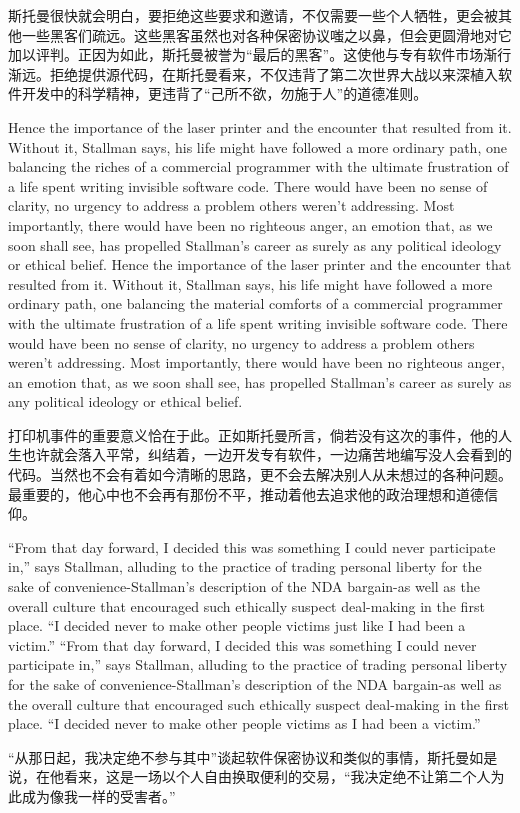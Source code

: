 \ifdefined\chs
斯托曼很快就会明白，要拒绝这些要求和邀请，不仅需要一些个人牺牲，更会被其他一些黑客们疏远。这些黑客虽然也对各种保密协议嗤之以鼻，但会更圆滑地对它加以评判。正因为如此，斯托曼被誉为``最后的黑客''。这使他与专有软件市场渐行渐远。拒绝提供源代码，在斯托曼看来，不仅违背了第二次世界大战以来深植入软件开发中的科学精神，更违背了``己所不欲，勿施于人''的道德准则。
\fi

\ifdefined\eng
\ifdefined\vone
Hence the importance of the laser printer and the encounter that resulted from it. Without it, Stallman says, his life might have followed a more ordinary path, one balancing the riches of a commercial programmer with the ultimate frustration of a life spent writing invisible software code. There would have been no sense of clarity, no urgency to address a problem others weren't addressing. Most importantly, there would have been no righteous anger, an emotion that, as we soon shall see, has propelled Stallman's career as surely as any political ideology or ethical belief.
\fi
\ifdefined\vtwo
Hence the importance of the laser printer and the encounter that resulted from it. Without it, Stallman says, his life might have followed a more ordinary path, one balancing the material comforts of a commercial programmer with the ultimate frustration of a life spent writing invisible software code. There would have been no sense of clarity, no urgency to address a problem others weren't addressing. Most importantly, there would have been no righteous anger, an emotion that, as we soon shall see, has propelled Stallman's career as surely as any political ideology or ethical belief.
\fi
\fi

\ifdefined\chs
打印机事件的重要意义恰在于此。正如斯托曼所言，倘若没有这次的事件，他的人生也许就会落入平常，纠结着，一边开发专有软件，一边痛苦地编写没人会看到的代码。当然也不会有着如今清晰的思路，更不会去解决别人从未想过的各种问题。最重要的，他心中也不会再有那份不平，推动着他去追求他的政治理想和道德信仰。 
\fi

\ifdefined\eng
\ifdefined\vone
``From that day forward, I decided this was something I could never participate in,'' says Stallman, alluding to the practice of trading personal liberty for the sake of convenience-Stallman's description of the NDA bargain-as well as the overall culture that encouraged such ethically suspect deal-making in the first place. ``I decided never to make other people victims just like I had been a victim.''
\fi
\ifdefined\vtwo
``From that day forward, I decided this was something I could never participate in,'' says Stallman, alluding to the practice of trading personal liberty for the sake of convenience-Stallman's description of the NDA bargain-as well as the overall culture that encouraged such ethically suspect deal-making in the first place. ``I decided never to make other people victims as I had been a victim.''
\fi
\fi

\ifdefined\chs
``从那日起，我决定绝不参与其中''谈起软件保密协议和类似的事情，斯托曼如是说，在他看来，这是一场以个人自由换取便利的交易，``我决定绝不让第二个人为此成为像我一样的受害者。''
\fi

\theendnotes
\setcounter{endnote}{0}
